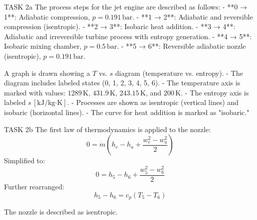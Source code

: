 TASK 2a  
The process steps for the jet engine are described as follows:  
- **0 → 1**: Adiabatic compression, \( p = 0.191 \, \text{bar} \).  
- **1 → 2**: Adiabatic and reversible compression (isentropic).  
- **2 → 3**: Isobaric heat addition.  
- **3 → 4**: Adiabatic and irreversible turbine process with entropy generation.  
- **4 → 5**: Isobaric mixing chamber, \( p = 0.5 \, \text{bar} \).  
- **5 → 6**: Reversible adiabatic nozzle (isentropic), \( p = 0.191 \, \text{bar} \).  

A graph is drawn showing a \( T \) vs. \( s \) diagram (temperature vs. entropy).  
- The diagram includes labeled states (0, 1, 2, 3, 4, 5, 6).  
- The temperature axis is marked with values: \( 1289 \, \text{K} \), \( 431.9 \, \text{K} \), \( 243.15 \, \text{K} \), and \( 200 \, \text{K} \).  
- The entropy axis is labeled \( s \, [\text{kJ}/\text{kg·K}] \).  
- Processes are shown as isentropic (vertical lines) and isobaric (horizontal lines).  
- The curve for heat addition is marked as "isobaric."  

TASK 2b  
The first law of thermodynamics is applied to the nozzle:  
\[
0 = \dot{m} \left( h_e - h_a + \frac{w_e^2 - w_a^2}{2} \right)
\]
Simplified to:  
\[
0 = h_5 - h_6 + \frac{w_5^2 - w_6^2}{2}
\]  
Further rearranged:  
\[
h_5 - h_6 = c_p (T_5 - T_6)
\]  

The nozzle is described as isentropic.